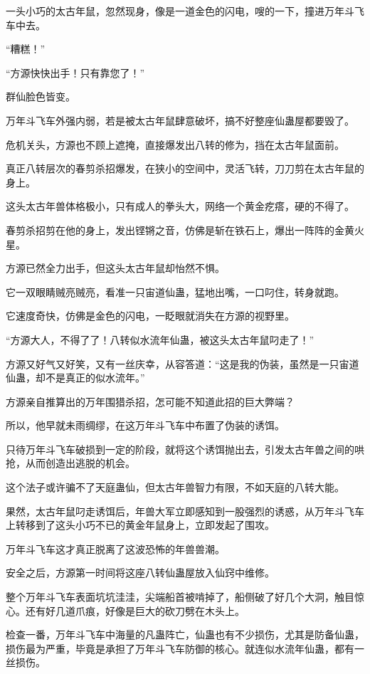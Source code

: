 \begin{this_body}
一头小巧的太古年鼠，忽然现身，像是一道金色的闪电，嗖的一下，撞进万年斗飞车中去。

“糟糕！”

“方源快快出手！只有靠您了！”

群仙脸色皆变。

万年斗飞车外强内弱，若是被太古年鼠肆意破坏，搞不好整座仙蛊屋都要毁了。

危机关头，方源也不顾上遮掩，直接爆发出八转的修为，挡在太古年鼠面前。

真正八转层次的春剪杀招爆发，在狭小的空间中，灵活飞转，刀刀剪在太古年鼠的身上。

这头太古年兽体格极小，只有成人的拳头大，网络一个黄金疙瘩，硬的不得了。

春剪杀招剪在他的身上，发出铿锵之音，仿佛是斩在铁石上，爆出一阵阵的金黄火星。

方源已然全力出手，但这头太古年鼠却怡然不惧。

它一双眼睛贼亮贼亮，看准一只宙道仙蛊，猛地出嘴，一口叼住，转身就跑。

它速度奇快，仿佛是金色的闪电，一眨眼就消失在方源的视野里。

“方源大人，不得了了！八转似水流年仙蛊，被这头太古年鼠叼走了！”

方源又好气又好笑，又有一丝庆幸，从容答道：“这是我的伪装，虽然是一只宙道仙蛊，却不是真正的似水流年。”

方源亲自推算出的万年围猎杀招，怎可能不知道此招的巨大弊端？

所以，他早就未雨绸缪，在这万年斗飞车中布置了伪装的诱饵。

只待万年斗飞车破损到一定的阶段，就将这个诱饵抛出去，引发太古年兽之间的哄抢，从而创造出逃脱的机会。

这个法子或许骗不了天庭蛊仙，但太古年兽智力有限，不如天庭的八转大能。

果然，太古年鼠叼走诱饵后，年兽大军立即感知到一股强烈的诱惑，从万年斗飞车上转移到了这头小巧不已的黄金年鼠身上，立即发起了围攻。

万年斗飞车这才真正脱离了这波恐怖的年兽兽潮。

安全之后，方源第一时间将这座八转仙蛊屋放入仙窍中维修。

整个万年斗飞车表面坑坑洼洼，尖端船首被啃掉了，船侧破了好几个大洞，触目惊心。还有好几道爪痕，好像是巨大的砍刀劈在木头上。

检查一番，万年斗飞车中海量的凡蛊阵亡，仙蛊也有不少损伤，尤其是防备仙蛊，损伤最为严重，毕竟是承担了万年斗飞车防御的核心。就连似水流年仙蛊，都有一丝损伤。


\end{this_body}
